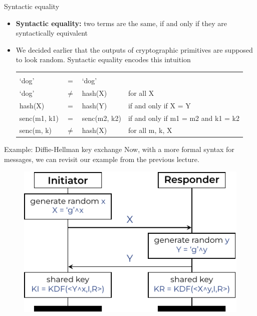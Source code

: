 \documentclass[11pt,aspectratio=169]{beamer}
\begin{document}
\begin{frame}[fragile]{Syntactic equality}
    \begin{itemize}
        \item \textbf{Syntactic equality:} two terms are the same, if and only 
              if they are syntactically equivalent
        \item We decided earlier that the outputs of cryptographic primitives 
              are supposed to look random. Syntactic equality encodes this intuition

        \begin{tabular}{lcll}
            & & & \\
              \textcolor{TermBlue}{`dog'}
            & \textcolor{TermBlue}{=}
            & \textcolor{TermBlue}{`dog'}
            & \\
              \textcolor{TermBlue}{`dog'}
            & \textcolor{TermBlue}{$\neq$}
            & \textcolor{TermBlue}{hash(X)}
            & for all \textcolor{TermBlue}{X}\\
              \textcolor{TermBlue}{hash(X)}
            & \textcolor{TermBlue}{=}
            & \textcolor{TermBlue}{hash(Y)}
            & if and only if \textcolor{TermBlue}{X = Y}\\
              \textcolor{TermBlue}{senc(m1, k1)}
            & \textcolor{TermBlue}{=}
            & \textcolor{TermBlue}{senc(m2, k2)}
            & if and only if \textcolor{TermBlue}{m1 = m2} and
              \textcolor{TermBlue}{k1 = k2}\\
              \textcolor{TermBlue}{senc(m, k)}
            & \textcolor{TermBlue}{$\neq$}
            & \textcolor{TermBlue}{hash(X)}
            & for all \textcolor{TermBlue}{m, k, X}\\
        \end{tabular}    
    \end{itemize}
\end{frame}

\begin{frame}[fragile]{Example: Diffie-Hellman key exchange}
    Now, with a more formal syntax for messages, we can revisit our example 
    from the previous lecture.
    \begin{figure}
        \includegraphics[width=.5\textwidth]{./figures/lecture_1/dh}
    \end{figure}
\end{frame}
\end{document}
